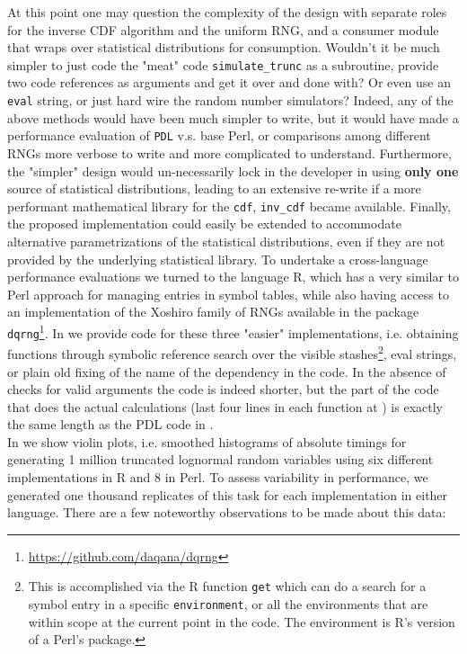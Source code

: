 \documentclass[10pt]{article}
\begin{document}
At this point one may question the complexity of the design with separate roles for the inverse CDF algorithm and the uniform RNG, and a consumer module that wraps over statistical distributions for consumption. Wouldn't it be much simpler to just code the "meat" code \texttt{simulate\_trunc} as a subroutine, provide two code references as arguments and get it over and done with? Or even use an \texttt{eval} string, or just hard wire the random number simulators? Indeed, any of the above methods would have been much simpler to write, but it would have made a performance evaluation of \texttt{PDL} v.s. base Perl, or comparisons among different RNGs more verbose to write and more complicated to understand. Furthermore, the "simpler" design would un-necessarily lock in the developer in using \textbf{only one} source of statistical distributions, leading to an extensive re-write if a more performant mathematical library for the \texttt{cdf}, \texttt{inv\_cdf} became available. Finally, the proposed implementation could easily be extended to accommodate alternative parametrizations of the statistical distributions, even if they are not provided by the underlying statistical library.   
To undertake a cross-language performance evaluations we turned to the language R, which has a very similar to Perl approach for managing entries in symbol tables, while also having access to an implementation of the Xoshiro family of RNGs available in the package \texttt{dqrng}\footnote{\url{https://github.com/daqana/dqrng}}. In  we provide code for these three "easier" implementations, i.e. obtaining functions through symbolic reference search over the visible stashes\footnote{This is accomplished via the R function \texttt{get} which can do a search for a symbol entry in a specific \texttt{environment}, or all the environments that are within scope at the current point in the code.  The environment is R's version of a Perl's package.}, eval strings, or plain old fixing of the name of the dependency in the code. In the absence of checks for valid arguments the code is indeed shorter, but the part of the code that does the actual calculations (last four lines in each function at ) is exactly the same length as the PDL code in .
\\
In  we show violin plots, i.e. smoothed histograms of absolute timings for generating 1 million truncated lognormal random variables using six different implementations in R and 8 in Perl. To assess variability in performance, we generated one thousand replicates of this task for each implementation in either language. There are a few noteworthy observations to be made about this data:
\end{document}
